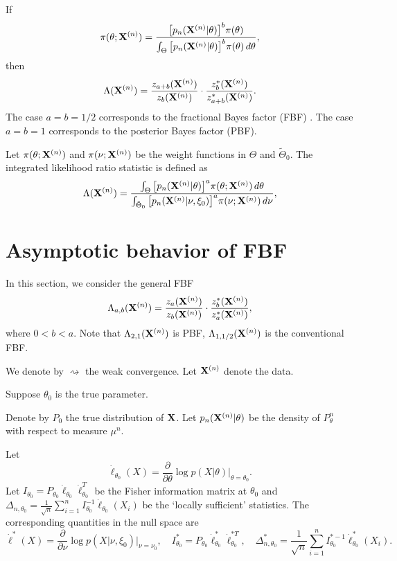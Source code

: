 \documentclass[3p]{elsarticle}
\theoremstyle{plain}
\theoremstyle{definition}
\theoremstyle{remark}
\begin{document}
If
$$
\pi(\theta;\mathbf{X}^{(n)})=\frac{\big[p_n(\mathbf{X}^{(n)}|\theta)\big]^b \pi(\theta)}{\int_{\Theta}\big[p_n(\mathbf{X}^{(n)}|\theta)\big]^b \pi(\theta)\, d\theta},
$$
then
$$
\Lambda(\mathbf{X}^{(n)})= \frac{z_{a+b}(\mathbf{X}^{(n)})}{z_{b}(\mathbf{X}^{(n)})}\cdot \frac{z_{b}^*(\mathbf{X}^{(n)})}{z_{a+b}^*(\mathbf{X}^{(n)})}.
$$
The case $a=b=1/2$ corresponds to the fractional Bayes factor (FBF) \citep{Fractional1995}.
The case $a=b=1$ corresponds to the posterior Bayes factor (PBF).


Let $\pi(\theta;\mathbf{X}^{(n)})$ and $\pi(\nu;\mathbf{X}^{(n)})$ be the weight functions in $\Theta$ and $\tilde{\Theta}_0$.
The integrated likelihood ratio statistic is defined as
\begin{equation}
    \Lambda (\mathbf{X}^{(n)})=\frac{\int_{\Theta} \big[p_n(\mathbf{X}^{(n)}|\theta)\big]^{a}\pi(\theta;\mathbf{X}^{(n)})\,d\theta}{\int_{\tilde{\Theta}_0} \big[p_n(\mathbf{X}^{(n)}|\nu,\xi_0)\big]^{a}\pi(\nu;\mathbf{X}^{(n)})\,d\nu},
\end{equation}



\section{Asymptotic behavior of FBF}
In this section, we consider the general FBF
\begin{equation*}
    \Lambda_{a,b}(\mathbf{X}^{(n)})=
    \frac{z_{a}(\mathbf{X}^{(n)})}{z_{b}(\mathbf{X}^{(n)})}\cdot \frac{z_{b}^*(\mathbf{X}^{(n)})}{z_{a}^*(\mathbf{X}^{(n)})},
\end{equation*}
where $0<b<a$.
Note that $\Lambda_{2,1}(\mathbf{X}^{(n)})$ is PBF, $\Lambda_{1,1/2}(\mathbf{X}^{(n)})$ is the conventional FBF.



We denote by $\rightsquigarrow$ the weak convergence. 
Let $\mathbf{X}^{(n)}$ denote the data.

Suppose $\theta_0$ is the true parameter.

Denote by $P_0$ the true distribution of $\mathbf{X}$.
Let $p_{n}(\mathbf{X}^{(n)}|\theta)$ be the density of  $P_{\theta}^{n}$ with respect to measure $\mu^n$.


Let 
$$\dot{\ell}_{\theta_0}(X)=\frac{\partial}{\partial \theta}\log p(X|\theta)\Big|_{\theta=\theta_0}.$$
Let $I_{\theta_0}=P_{\theta_0}\dot{\ell}_{\theta_0}\dot{\ell}_{\theta_0}^T$ be the Fisher information matrix at $\theta_0$ and $\Delta_{n,\theta_0}=\frac{1}{\sqrt{n}}\sum_{i=1}^n I_{\theta_0}^{-1}\dot{\ell}_{\theta_0}(X_i)$ be the `locally sufficient' statistics.
The corresponding quantities in the null space are 
$$\dot{\ell}^*(X)=\frac{\partial}{\partial \nu}\log p(X|\nu,\xi_0)\Big|_{\nu=\nu_0}, \quad I^*_{\theta_0}=P_{\theta_0}\dot{\ell}_{\theta_0}^*\dot{\ell}_{\theta_0}^{*T},\quad \Delta_{n,\theta_0}^*
=\frac{1}{\sqrt{n}}\sum_{i=1}^n I_{\theta_0}^{*-1}\dot{\ell}^{*}_{\theta_0}(X_i).
$$
\end{document}
